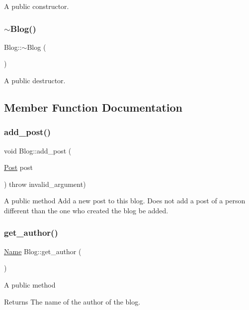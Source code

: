A public constructor. \mbox{\label{class_blog_a0b2c662d24dee57b9b897e9aaef74233}} 
\subsubsection{\texorpdfstring{$\sim$\+Blog()}{~Blog()}}
{\footnotesize\ttfamily Blog\+::$\sim$\+Blog (\begin{DoxyParamCaption}{ }\end{DoxyParamCaption})}

A public destructor. 

\subsection{Member Function Documentation}
\mbox{\label{class_blog_a5299f1a5721555bdb6f9af07df9def41}} 
\subsubsection{\texorpdfstring{add\+\_\+post()}{add\_post()}}
{\footnotesize\ttfamily void Blog\+::add\+\_\+post (\begin{DoxyParamCaption}\item[{\hyperlink{class_post}{Post}}]{post }\end{DoxyParamCaption}) throw  invalid\+\_\+argument) }

A public method Add a new post to this blog. Does not add a post of a person different than the one who created the blog be added. \mbox{\label{class_blog_a794238dfa9289de8bd7d9e4d811c85b7}} 
\subsubsection{\texorpdfstring{get\+\_\+author()}{get\_author()}}
{\footnotesize\ttfamily \hyperlink{class_name}{Name} Blog\+::get\+\_\+author (\begin{DoxyParamCaption}{ }\end{DoxyParamCaption})}

A public method \begin{DoxyReturn}{Returns}
The name of the author of the blog. 
\end{DoxyReturn}
\mbox{\label{class_blog_a45fed99771b904d4a9eaa3846f24f0b0}} 
